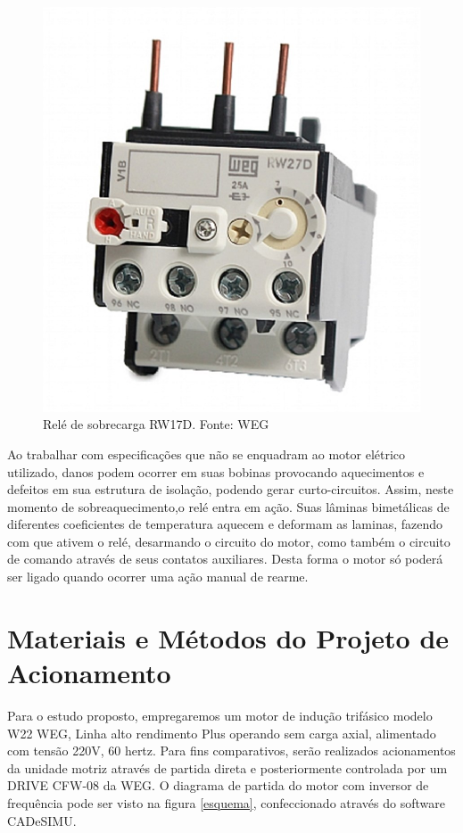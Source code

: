 \documentclass[a4paper, 12pt,oneside, english, brazil]{abntex2}
\begin{document}
\begin{figure}[H]
    \centering
    \includegraphics[scale=0.3]{RW17weg.jpg}
    \caption{Relé de sobrecarga RW17D. Fonte: WEG}
    \label{reeet}
\end{figure}

Ao trabalhar com especificações que não se enquadram ao motor elétrico utilizado, danos podem ocorrer em suas bobinas provocando aquecimentos e defeitos em sua estrutura de isolação, podendo gerar curto-circuitos. Assim, neste momento de sobreaquecimento,o relé entra em ação. Suas lâminas bimetálicas de diferentes coeficientes de temperatura aquecem e deformam as laminas, fazendo com que ativem o relé, desarmando o circuito do motor, como também o circuito de comando através de seus contatos auxiliares.
Desta forma o motor só poderá ser ligado quando ocorrer uma ação manual de rearme.

\chapter{Materiais e Métodos do Projeto de Acionamento}
Para o estudo proposto, empregaremos um motor de indução trifásico modelo W22 WEG, Linha alto rendimento Plus operando sem carga axial, alimentado com tensão 220V, 60 hertz. Para fins comparativos, serão realizados acionamentos da unidade motriz através de partida direta e posteriormente controlada por um DRIVE CFW-08 da WEG. O diagrama de partida do motor com inversor de frequência pode ser visto na figura \ref{esquema}, confeccionado através do software CADeSIMU.
\end{document}
